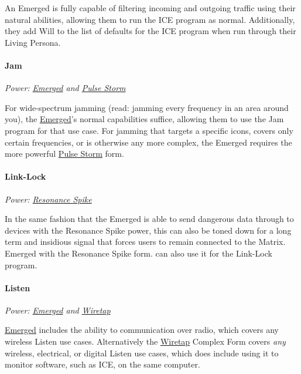 \begin{multicols*}{3}
	An Emerged is fully capable of filtering incoming and outgoing traffic using their natural abilities, allowing them to run the ICE program as normal. Additionally, they add Will to the list of defaults for the ICE program when run through their Living Persona.
	
	\paragraph{Jam}
	\begin{center}
		\textit{Power: \hyperref[emerged]{Emerged} and \hyperref[pulse_storm]{Pulse Storm}}
	\end{center}

	For wide-spectrum jamming (read: jamming every frequency in an area around you), the \hyperref[emerged]{Emerged}'s normal capabilities suffice, allowing them to use the Jam program for that use case. For jamming that targets a specific icons, covers only certain frequencies, or is otherwise any more complex, the Emerged requires the more powerful \hyperref[pulse_storm]{Pulse Storm} form.
	
	\paragraph{Link-Lock}
	\begin{center}
		\textit{Power: \hyperref[resonance_spike]{Resonance Spike}}
	\end{center}

	In the same fashion that the Emerged is able to send dangerous data through to devices with the Resonance Spike power, this can also be toned down for a long term and insidious signal that forces users to remain connected to the Matrix. Emerged with the Resonance Spike form. can also use it for the Link-Lock program.
	
	\paragraph{Listen}
	\begin{center}
		\textit{Power: \hyperref[emerged]{Emerged} and \hyperref[wiretap]{Wiretap}}
	\end{center}

	\hyperref[emerged]{Emerged} includes the ability to communication over radio, which covers any wireless Listen use cases. Alternatively the \hyperref[wiretap]{Wiretap} Complex Form covers \textit{any} wireless, electrical, or digital Listen use cases, which does include using it to monitor software, such as ICE, on the same computer.
	

\end{multicols*}
